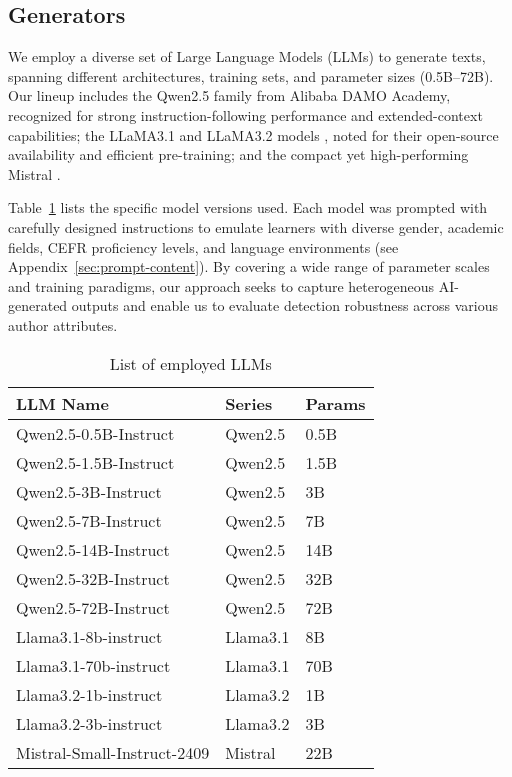 \subsection{Generators}

We employ a diverse set of Large Language Models (LLMs) to generate texts, spanning different architectures, training sets, and parameter sizes (0.5B–72B). Our lineup includes the Qwen2.5 family \citep{qwen2,qwen2.5} from Alibaba DAMO Academy, recognized for strong instruction-following performance and extended-context capabilities; the LLaMA3.1 and LLaMA3.2 models \citep{dubey2024llama3herdmodels}, noted for their open-source availability and efficient pre-training; and the compact yet high-performing Mistral \citep{jiang2023mistral7b}.

Table~\ref{tab:LLMs} lists the specific model versions used. Each model was prompted with carefully designed instructions to emulate learners with diverse gender, academic fields, CEFR proficiency levels, and language environments (see Appendix~\ref{sec:prompt-content}). By covering a wide range of parameter scales and training paradigms, our approach seeks to capture heterogeneous AI-generated outputs and enable us to evaluate detection robustness across various author attributes.




\begin{table}[t]
\centering
\small
\begin{tabular}{lll}
\toprule
\textbf{LLM Name} & \textbf{Series} & \textbf{Params} \\
\midrule
Qwen2.5-0.5B-Instruct & Qwen2.5 & 0.5B \\
Qwen2.5-1.5B-Instruct & Qwen2.5 & 1.5B \\
Qwen2.5-3B-Instruct   & Qwen2.5 & 3B \\
Qwen2.5-7B-Instruct   & Qwen2.5 & 7B \\
Qwen2.5-14B-Instruct  & Qwen2.5 & 14B \\
Qwen2.5-32B-Instruct  & Qwen2.5 & 32B \\
Qwen2.5-72B-Instruct  & Qwen2.5 & 72B \\
\midrule
Llama3.1-8b-instruct  & Llama3.1 & 8B \\
Llama3.1-70b-instruct & Llama3.1 & 70B \\
\midrule
Llama3.2-1b-instruct  & Llama3.2 & 1B \\
Llama3.2-3b-instruct  & Llama3.2 & 3B \\
\midrule
Mistral-Small-Instruct-2409 & Mistral & 22B \\
\bottomrule
\end{tabular}
\caption{List of employed LLMs}
\label{tab:LLMs}
\end{table}

